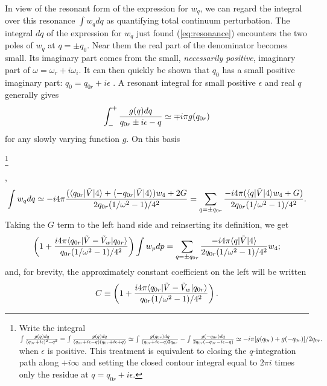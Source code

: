 \documentclass[12pt]{article}
\def\ket#1{|#1\rangle}
\def\bra#1{\langle#1}
\begin{document}
In view of the resonant form of the expression for $w_q$, we can regard the
integral over this resonance $\int w_q dq$ as quantifying total
continuum perturbation.  The integral $dq$ of the expression for $w_q$
just found (\ref{eq:resonance}) encounters the two poles of $w_q$ at
$q=\pm q_0$.
Near them the real
part of the denominator becomes small. Its imaginary part comes from
the small, \emph{necessarily positive}, imaginary part of
$\omega=\omega_r+i\omega_i$. It can then quickly be shown that $q_0$
has a small positive imaginary part: $q_0=q_{0r}+i\epsilon$ .  A resonant integral for small
positive $\epsilon$ and real $q$ generally gives
\begin{equation}
  \label{resint}
  \int_{-}^{+} {g(q) dq\over q_{0r}\pm i\epsilon-q}\simeq \mp i\pi g(q_{0r})
\end{equation}
for any slowly varying function $g$. On this basis
\iftrue
\footnote{Write the integral $\int{g(q)dq\over
  (q_{0r}+i\epsilon)^2-q^2}=\int{g(q)dq\over 
(q_{0r}+i\epsilon-q)(q_{0r}+i\epsilon+q)}\simeq \int{g(q_{0r})dq\over
  (q_{0r}+i\epsilon-q)2q_{0r}}-\int{g(-q_{0r})dq\over
  2q_{0r}(-q_{0r}-i\epsilon-q) }\simeq -i\pi [g(q_{0r})+g(-q_{0r})]/2q_{0r}. $ when
 $\epsilon$ is
positive. This treatment is equivalent to closing the $q$-integration path
along $+i\infty$ and setting the closed contour integral equal to
$2\pi i$ times only the residue at $q=q_{0r}+i\epsilon$.}
\fi
,
\begin{equation}
  \label{poles}
  \int w_q dq \simeq -i4\pi {(\bra{q_{0r}}|\tilde{V}\ket{4}
    +\bra{-q_{0r}}|\tilde{V}\ket{4})w_4+2G
    \over
    2q_{0r}(1/\omega^2-1)/4^2
  }
  =\sum_{q=\pm q_{0r}}{-i4\pi(\bra{q}|\tilde{V}\ket{4}w_4+G)
    \over
    2q_{0r}(1/\omega^2-1)/4^2}.
\end{equation}
Taking the $G$ term to the left hand side and reinserting its definition, we get
\begin{equation}
  \label{eq:22}
  \left(1+{i4\pi \bra{q_{0r}}|\tilde{V}-\tilde{V}_{w}\ket{q_{0r}}\over
      q_{0r}(1/\omega^2-1)/4^2}\right)\int w_pdp
  =\sum_{q=\pm q_{0r}}{-i4\pi\bra{q}|\tilde{V}\ket{4}  \over
    2q_{0r}(1/\omega^2-1)/4^2}w_4;
\end{equation}
and, for brevity, the approximately constant coefficient on the left will
be written
\begin{equation}
  \label{eq:23}
  C \equiv \left(1+{i4\pi\bra{q_{0r}}|\tilde{V}-\tilde{V}_{w}\ket{q_{0r}}\over q_{0r}(1/\omega^2-1)/4^2}\right).
\end{equation}
\end{document}
